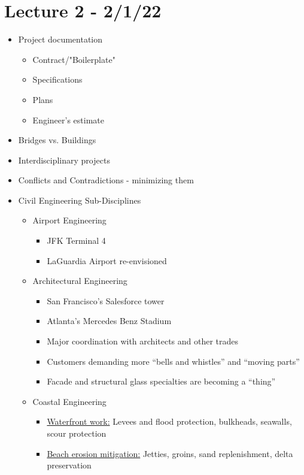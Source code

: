 \documentclass{article}
\begin{document}
\section*{Lecture 2 - 2/1/22}
\begin{itemize}
    \item Project documentation
    \begin{itemize}
          \item Contract/"Boilerplate"
          \item Specifications
          \item Plans
          \item Engineer's estimate
    \end{itemize}
    \item Bridges vs. Buildings
    \item Interdisciplinary projects
    \item Conflicts and Contradictions - minimizing them
    \item Civil Engineering Sub-Disciplines
    \begin{itemize}
        \item Airport Engineering
        \begin{itemize}
            \item JFK Terminal 4
            \item LaGuardia Airport re-envisioned
        \end{itemize}
        \item Architectural Engineering
        \begin{itemize}
            \item San Francisco's Salesforce tower
            \item Atlanta's Mercedes Benz Stadium
            \item Major coordination with architects and other trades
            \item Customers demanding more ``bells and whistles'' and ``moving parts''
            \item Facade and structural glass specialties are becoming a ``thing''
        \end{itemize}
        \item Coastal Engineering
        \begin{itemize}
            \item \underline{Waterfront work:} Levees and flood protection, bulkheads, seawalls, scour protection
            \item \underline{Beach erosion mitigation:} Jetties, groins, sand replenishment, delta preservation

\end{itemize}
\end{itemize}
\end{itemize}
\end{document}
